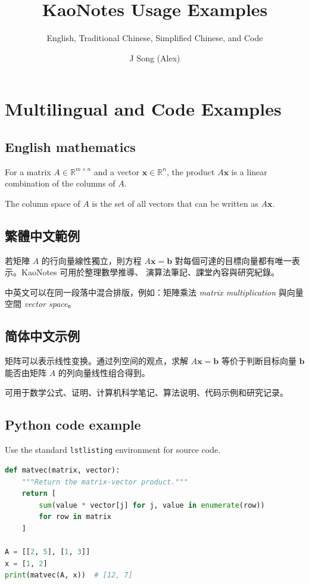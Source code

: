\documentclass[
	a4paper,
	fontsize=10pt,
	open=any,
	titlepage=false,
	numbers=noenddot,
]{kaobook}
\title{KaoNotes Usage Examples}
\subtitle{English, Traditional Chinese, Simplified Chinese, and Code}
\author{J Song (Alex)}
\date{}
\begin{document}
\maketitle

\chapter{Multilingual and Code Examples}

\section{English mathematics}

For a matrix \(A\in\mathbb{R}^{m\times n}\) and a vector
\(\mathbf{x}\in\mathbb{R}^{n}\), the product \(A\mathbf{x}\) is a linear
combination of the columns of \(A\).

\begin{definition}
The column space of \(A\) is the set of all vectors that can be written as
\(A\mathbf{x}\).
\end{definition}

\section{繁體中文範例}

若矩陣 \(A\) 的行向量線性獨立，則方程 \(A\mathbf{x}=\mathbf{b}\)
對每個可達的目標向量都有唯一表示。KaoNotes 可用於整理數學推導、
演算法筆記、課堂內容與研究紀錄。

\begin{remark}
中英文可以在同一段落中混合排版，例如：矩陣乘法
\emph{matrix multiplication} 與向量空間 \emph{vector space}。
\end{remark}

\begingroup
\zhHans

\section{\zhHans 简体中文示例}

矩阵可以表示线性变换。通过列空间的观点，求解
\(A\mathbf{x}=\mathbf{b}\) 等价于判断目标向量 \(\mathbf{b}\)
能否由矩阵 \(A\) 的列向量线性组合得到。

\begin{kaobox}[frametitle={\zhHans 书写范围}]
可用于数学公式、证明、计算机科学笔记、算法说明、代码示例和研究记录。
\end{kaobox}

\endgroup

\section{Python code example}

Use the standard \texttt{lstlisting} environment for source code.

\begin{lstlisting}[language=Python, caption={Matrix-vector multiplication}]
def matvec(matrix, vector):
    """Return the matrix-vector product."""
    return [
        sum(value * vector[j] for j, value in enumerate(row))
        for row in matrix
    ]

A = [[2, 5], [1, 3]]
x = [1, 2]
print(matvec(A, x))  # [12, 7]
\end{lstlisting}
\end{document}
